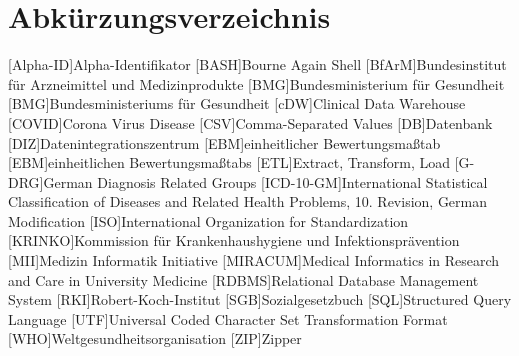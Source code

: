 \chapter*{Abkürzungsverzeichnis}
\setcounter{page}{4}
\begin{acronym}[ICD-10-GM]
	[Alpha-ID]{Alpha-Identifikator}
	[BASH]{Bourne Again Shell}		
	[BfArM]{Bundesinstitut für Arzneimittel und Medizinprodukte}
	[BMG]{Bundesministerium für Gesundheit}	
	[BMG]{Bundesministeriums für Gesundheit}
	[cDW]{Clinical Data Warehouse}
	[COVID]{Corona Virus Disease}	
	[CSV]{Comma-Separated Values}	
	[DB]{Datenbank}
	[DIZ]{Datenintegrationszentrum}	
	[EBM]{einheitlicher Bewertungsmaßtab}
	[EBM]{einheitlichen Bewertungsmaßtabs}
	[ETL]{Extract, Transform, Load}
	[G-DRG]{German Diagnosis Related Groups}	
	[ICD-10-GM]{International Statistical Classification of Diseases and Related Health Problems, 10. Revision, German Modification}	
	[ISO]{International Organization for Standardization}
	[KRINKO]{Kommission für Krankenhaushygiene und Infektionsprävention}	
	[MII]{Medizin Informatik Initiative}
	[MIRACUM]{Medical Informatics in Research and Care in University Medicine}
	[RDBMS]{Relational Database Management System}	
	[RKI]{Robert-Koch-Institut}
	[SGB]{Sozialgesetzbuch}
	[SQL]{Structured Query Language}
	[UTF]{Universal Coded Character Set Transformation Format}
	[WHO]{Weltgesundheitsorganisation}
	[ZIP]{Zipper}
\end{acronym}

